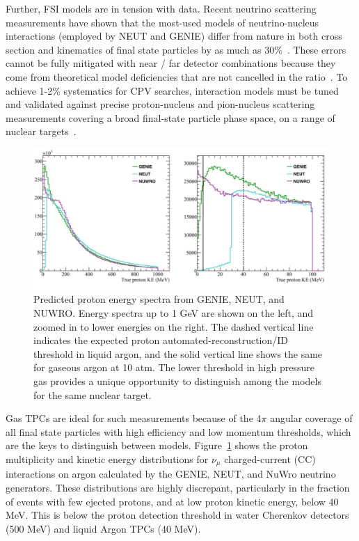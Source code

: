Further, FSI models are in tension with data.  
Recent neutrino scattering measurements have shown that the most-used models of neutrino-nucleus interactions (employed by NEUT and GENIE) differ from nature in both cross section and kinematics of final state particles by as much as 30\%~\cite{Wascko:2009cn,Wascko:2011hy}. 
These errors cannot be fully mitigated with near / far detector combinations because they come from theoretical model deficiencies that are not cancelled in the ratio~\cite{Coloma:2013rqa}. 
To achieve 1-2\% systematics for CPV searches, interaction models must be tuned and validated against precise proton-nucleus and pion-nucleus scattering measurements covering a broad final-state particle phase space, on a range of nuclear targets~\cite{Cao:2014zra}.

\begin{figure}%
    \centering
    \includegraphics[width=12cm]{files/Figures/protons_from_argon.jpeg}%
    \caption{Predicted proton energy spectra from GENIE, NEUT, and NUWRO. Energy spectra up to 1 GeV are shown on the left, and zoomed in to lower energies on the right. The dashed vertical line indicates the expected proton automated-reconstruction/ID threshold in liquid argon, and the solid vertical line shows the same for gaseous argon at 10 atm. The lower threshold in high pressure gas provides a unique opportunity to distinguish among the models for the same nuclear target.}
    \label{fig:protonsfromargon}%
\end{figure}
Gas TPCs are ideal for such measurements because of the 4$\pi$ angular coverage of all final state particles with high efficiency and low momentum thresholds, which are the keys to distinguish between models.  
Figure~\ref{fig:protonsfromargon} shows the proton multiplicity and kinetic energy distributions for $\nu_{\mu}$ charged-current (CC) interactions on argon calculated by the GENIE, NEUT, and NuWro neutrino generators.  
These distributions are highly discrepant, particularly in the fraction of events with few ejected protons, and at low proton kinetic energy, below 40 MeV. 
This is below the proton detection threshold in water Cherenkov detectors (500 MeV) and liquid Argon TPCs (40 MeV). 

